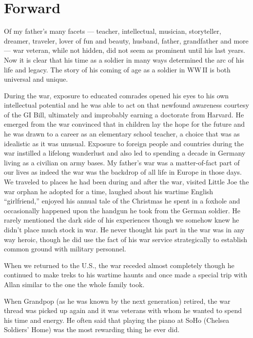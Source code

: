 \chapter*{Forward}

\thispagestyle{plain}
\label{forward}
Of my father's many facets --- teacher, intellectual, musician, storyteller, dreamer, traveler, lover of fun and beauty, husband, father, grandfather and more --- war veteran, while not hidden, did not seem as prominent until his last years. Now it is clear that his time as a soldier in many ways determined the arc of his life and legacy. The story of his coming of age as a soldier in WW\,II is both universal and unique.

During the war, exposure to educated comrades opened his eyes to his own intellectual potential and he was able to act on that newfound awareness courtesy of the GI Bill, ultimately and improbably earning a doctorate from Harvard. He emerged from the war convinced that in children lay the hope for the future and he was drawn to a career as an elementary school teacher, a choice that was as idealistic as it was unusual. Exposure to foreign people and countries during the war instilled a lifelong wanderlust and also led to spending a decade in Germany living as a civilian on army bases. My father's war was a matter-of-fact part of our lives as indeed the war was the backdrop of all life in Europe in those days. We traveled to places he had been during and after the war, visited Little Joe the war orphan he adopted for a time, laughed about his wartime English ``girlfriend,'' enjoyed his annual tale of the Christmas he spent in a foxhole and occasionally happened upon the handgun he took from the German soldier. He rarely mentioned the dark side of his experiences though we somehow knew he didn't place much stock in war. He never thought his part in the war was in any way heroic, though he did use the fact of his war service strategically to establish common ground with military personnel.

When we returned to the U.S., the war receded almost completely though he continued to make treks to his wartime haunts and once made a special trip with Allan similar to the one the whole family took.

When Grandpop (as he was known by the next generation) retired, the war thread was picked up again and it was veterans with whom he wanted to spend his time and energy. He often said that playing the piano at SoHo (Chelsea Soldiers' Home) was the most rewarding thing he ever did.

